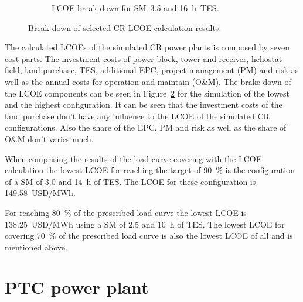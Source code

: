 \begin{figure}[!htbp]
\begin{subfigure}[b]{0.5\textwidth}
                \caption{LCOE break-down for SM~3.5 and \SI{16}{h}~TES.}\label{CR_LCOE_highinvest_BreakDown}
        \end{subfigure}
        \caption[Break-down of selected CR-LCOE calculation results.]{Break-down of selected CR-LCOE calculation results.}\label{CR_LCOE_BreakDown}
\end{figure}
The calculated LCOEs of the simulated CR power plants is composed by seven cost parts. The investment costs of power block, tower and receiver, heliostat field, land purchase, TES, additional EPC, project management (PM) and risk as well as the annual costs for operation and maintain (O\&M). The brake-down of the LCOE components can be seen in Figure~\ref{CR_LCOE_BreakDown} for the simulation of the lowest and the highest configuration.  It can be seen that the investment costs of the land purchase don't have any influence to the LCOE of the simulated CR configurations. Also the share of the EPC, PM and risk as well as the share of O\&M don't varies much.

When comprising the results of the load curve covering with the LCOE calculation the lowest LCOE for reaching the target of 90~\% is the configuration of a SM of 3.0 and \SI{14}{h} of TES. The LCOE for these configuration is \SI{149.58}{USD/MWh}. 

For reaching 80~\% of the prescribed load curve the lowest LCOE is \SI{138.25}{USD/MWh} using a SM of 2.5 and \SI{10}{h} of TES. The lowest LCOE for covering 70~\% of the prescribed load curve is also the lowest LCOE of all and is mentioned above.

\pagebreak
\section{PTC power plant}
